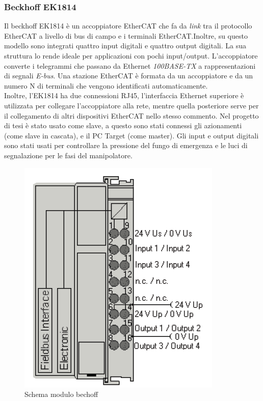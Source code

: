 \subsubsection{Beckhoff EK1814}
Il beckhoff EK1814 è un accoppiatore EtherCAT che fa da \textit{link} tra il protocollo EtherCAT a livello di bus di campo e i terminali EtherCAT.Inoltre, su questo modello sono integrati quattro input digitali e quattro output digitali. La sua struttura lo rende ideale per applicazioni con pochi input/output. L'accoppiatore converte i telegrammi che passano da Ethernet \textit{100BASE-TX} a rappresentazioni di segnali \textit{E-bus}. Una stazione EtherCAT è formata da un accoppiatore e da un numero N di terminali che vengono identificati automaticamente.
\\Inoltre, l'EK1814 ha due connessioni RJ45, l'interfaccia Ethernet superiore è utilizzata per collegare l'accoppiatore alla rete, mentre quella posteriore serve per il collegamento di altri dispositivi EtherCAT nello stesso commento. Nel progetto di tesi è stato usato come slave, a questo sono stati connessi gli azionamenti (come slave in cascata), e il PC Target (come master). Gli input e output digitali sono stati usati per controllare la pressione del fungo di emergenza e le luci di segnalazione per le fasi del manipolatore.
\begin{figure}[ht]
	\begin{center}
		\includegraphics[scale=0.6]{Immagini/Sperimentale/Beckoffschema.PNG}
		\caption{Schema modulo bechoff}
		\label{fig:ModuloBechoff}
	\end{center}
\end{figure}
